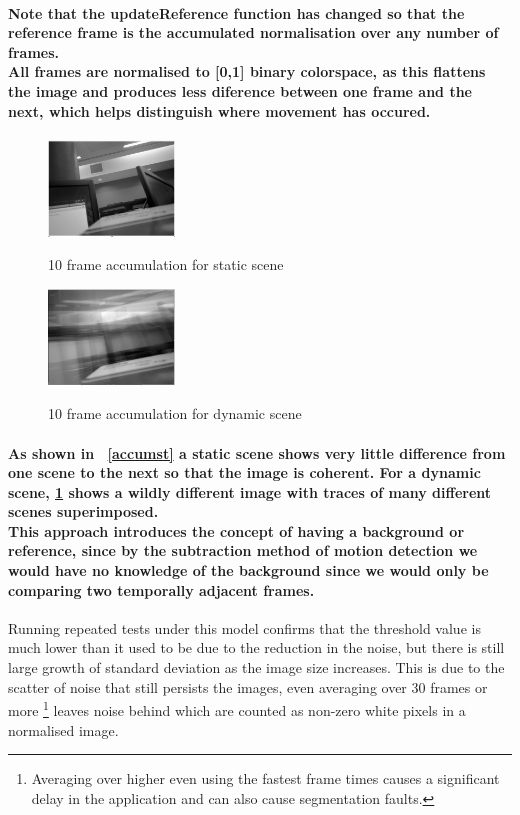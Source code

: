\documentclass[11pt]{article} %
\begin{document}
\paragraph{Note that the updateReference function has changed so that the reference frame is the accumulated normalisation over any number of frames. \\
All frames are normalised to [0,1]  binary colorspace, as this flattens the image and produces less diference between one frame and the next, which helps distinguish where movement has occured.
}
\begin{figure}
	\vspace{-20pt}
	\begin{center}
		\includegraphics[width=0.3\textwidth]{../images/accumstatic}
		\label{accumst}
	\end{center}
	\vspace{-20pt}
	\caption{10 frame accumulation for static scene}
	\vspace{10pt}
	\begin{center}
		\includegraphics[width=0.3\textwidth]{../images/accumdynamic}
		\label{accumdy}
	\end{center}
	\vspace{-20pt}
	\caption{10 frame accumulation for dynamic scene}
\end{figure}
\paragraph{As shown in ~\cref{accumst} a static scene shows very little difference from one scene to the next so that the image is coherent. For a dynamic scene, \cref{accumdy} shows a wildly different image with traces of many different scenes superimposed.
\\This approach introduces the concept of having a background or reference, since by the subtraction method of motion detection we would have no knowledge of the background since we would only be comparing two temporally adjacent frames.
}
Running repeated tests under this model confirms that the threshold value is much lower than it used to be due to the reduction in the noise, but there is still large growth of standard deviation as the image size increases. This is due to the scatter of noise that still persists the images, even averaging over 30 frames or more \footnote{Averaging over higher even using the fastest frame times causes a significant delay in the application and can also cause segmentation faults.}
leaves noise behind which are counted as non-zero white pixels in a normalised image.
\end{document}
